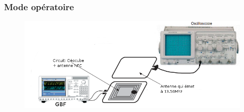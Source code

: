 \documentclass{beamer}
\begin{document}
\begin{frame}
\frametitle{Mode opératoire}
\begin{figure}
\centering
\includegraphics[scale=0.4]{images/gbfoscillo.png}
\end{figure}
\end{frame}
\end{document}
